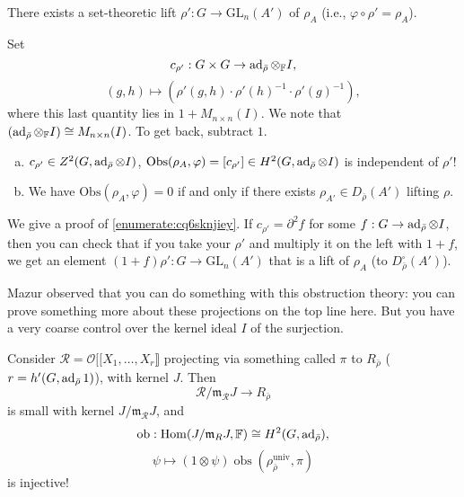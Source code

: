 \documentclass[reqno]{amsart} 
\begin{document}
\begin{fact}
  There exists a set-theoretic lift $\rho ' : G \rightarrow \mathrm{GL}_n(A')$ of $\rho_A$ (i.e., $\varphi \circ \rho ' = \rho_A$).
\end{fact}
\begin{definition}
  Set
  \begin{equation*}
    c_{\rho '} : G \times G \rightarrow \operatorname{ad}_{\bar{\rho}} \otimes_{\mathbb{F}} I,
  \end{equation*}
  \begin{equation*}
    (g, h) \mapsto(\rho '(g, h) \cdot \rho '(h)^{-1} \cdot \rho '(g)^{-1}),
  \end{equation*}
  where this last quantity lies in $1 + M_{n \times n}(I)$.  We note that $(\operatorname{ad}_{\bar{\rho}} \otimes_{\mathbb{F}} I) \cong M_{n \times n}(I)$.  To get back, subtract $1$.
\end{definition}
\begin{proposition}
  \begin{enumerate}[(a)]
  \item\label{enumerate:cq6sknji3b} $c_{\rho '} \in Z^2(G, \operatorname{ad}_{\bar{\rho}} \otimes I)$, $\mathrm{Obs}(\rho_A, \varphi) =[ c_{\rho '} ] \in H^2(G, \operatorname{ad}_{\bar{\rho}} \otimes I)$ is independent of $\rho '$!
  \item\label{enumerate:cq6sknjiey} We have $\mathrm{Obs}(\rho_A, \varphi) = 0$ if and only if there exists $\rho_{A'} \in D_{\bar{\rho}}(A')$ lifting $\rho$.
  \end{enumerate}
\end{proposition}
We give a proof of \eqref{enumerate:cq6sknjiey}.  If $c_{\rho '} = \partial^2 f$ for some $f : G \rightarrow \operatorname{ad}_{\bar{\rho}} \otimes I$, then you can check that if you take your $\rho '$ and multiply it on the left with $1 + f$, we get an element $(1 + f) \rho ' : G \rightarrow \mathrm{GL}_n(A')$ that is a lift of $\rho_A$ (to $D_{\bar{\rho}}^{\square}(A')$).

Mazur observed that you can do something with this obstruction theory: you can prove something more about these projections on the top line here.  But you have a very coarse control over the kernel ideal $I$ of the surjection.
\begin{theorem}
  Consider $\mathcal{R}  = \mathcal{O} [[  X_1, \dotsc, X_r \rrbracket$ projecting via something called $\pi$ to $R_{\bar{\rho}}$ ($r = h'(G, \operatorname{ad}_{\bar{\rho}} 1)$), with kernel $J$.  Then
  \begin{equation*}
    \mathcal{R} / \mathfrak{m}_{\mathcal{R}} J \rightarrow R_{\bar{\rho}}
  \end{equation*}
  is small with kernel $J / \mathfrak{m}_{\mathcal{R}} J$, and
  \begin{equation*}
    \mathrm{o b} : \operatorname{Hom}(J / \mathfrak{m}_R J, \mathbb{F}) \cong H^2(G, \operatorname{ad}_{\bar{\rho}}),
  \end{equation*}
  \begin{equation*}
    \psi \mapsto(1 \otimes \psi) \operatorname{o b s} \left( \rho_{\bar{\rho}}^{\mathrm{univ}}, \pi \right)
  \end{equation*}
  is injective!
\end{theorem}
\end{document}
